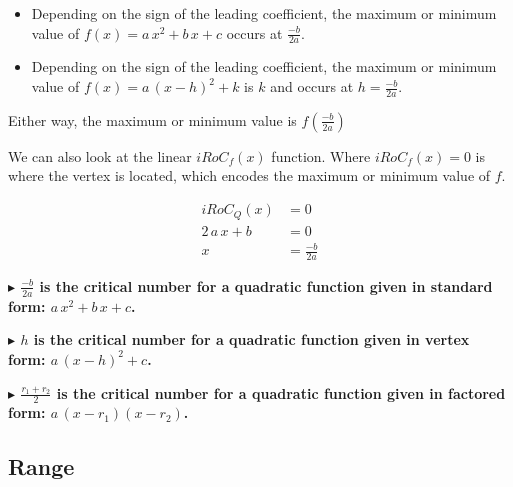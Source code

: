 \documentclass{ximera}
\begin{document}
\begin{itemize}
     \item Depending on the sign of the leading coefficient, the maximum or minimum value of $f(x) = a \, x^2 + b \, x + c$ occurs at $\frac{-b}{2a}$. 


     \item Depending on the sign of the leading coefficient, the maximum or minimum value of $f(x) = a \, (x - h)^2 + k$ is $k$ and occurs at $h = \frac{-b}{2a}$. 
\end{itemize}

Either way, the maximum or minimum value is $f\left( \frac{-b}{2a} \right)$




We can also look at the linear $iRoC_f(x)$ function.  Where $iRoC_f(x) = 0$ is where the vertex is located, which encodes the maximum or minimum value of $f$.





\begin{align*}
iRoC_Q(x)       &= 0  \\
2 \, a \, x + b  & = 0  \\
x     &=  \frac{-b}{2a}
\end{align*}




\textbf{\textcolor{blue!55!black}{$\blacktriangleright$ $\frac{-b}{2a}$ is the critical number for a quadratic function given in standard form: $a \, x^2 + b \, x + c$.}}  



\textbf{\textcolor{blue!55!black}{$\blacktriangleright$ $h$ is the critical number for a quadratic function given in vertex form: $a \, (x - h)^2 + c$.}}  



\textbf{\textcolor{blue!55!black}{$\blacktriangleright$ $\frac{r_1 + r_2}{2}$ is the critical number for a quadratic function given in factored form: $a \, (x - r_1) (x - r_2)$.}}  

















\subsection*{Range}
\end{document}
